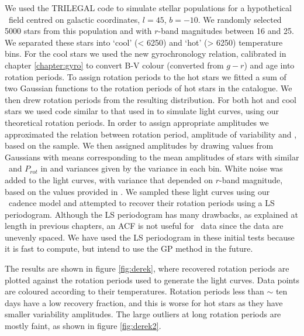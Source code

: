 We used the TRILEGAL \citep{Girardi2012} code to simulate stellar populations
for a hypothetical \LSST\ field centred on galactic coordinates, $l = 45$, $b
= -10$.
We randomly selected 5000 stars from this population and with $r$-band
magnitudes between 16 and 25.
We separated these stars into `cool' (< 6250) and `hot' (> 6250) temperature
bins.
For the cool stars we used the new gyrochronology relation, calibrated in
chapter \ref{chapter:gyro} to convert B-V colour (converted from $g-r$) and
age into rotation periods.
To assign rotation periods to the hot stars we fitted a sum of two Gaussian
functions to the rotation periods of hot stars in the \citet{Mcquillan2014}
catalogue.
We then drew rotation periods from the resulting distribution.
For both hot and cool stars we used code similar to that used in
\citet{Aigrain2015} to simulate light curves, using our theoretical rotation
periods.
In order to assign appropriate amplitudes we approximated the relation between
rotation period, amplitude of variability and \teff, based on the
\citet{Mcquillan2014} sample.
We then assigned amplitudes by drawing values from Gaussians with means
corresponding to the mean amplitudes of stars with similar \teff\ and
$P_{rot}$ in \citet{Mcquillan2014} and variances given by the variance in each
bin.
White noise was added to the light curves, with variance that depended on
$r$-band magnitude, based on the values provided in \citet{Jacklin2015}.
We sampled these light curves using our \LSST\ cadence model and attempted to
recover their rotation periods using a LS periodogram.
Although the LS periodogram has many drawbacks, as explained at length in
previous chapters, an ACF is not useful for \LSST\ data since the data are
unevenly spaced.
We have used the LS periodogram in these initial tests because it is fast to
compute, but intend to use the GP method in the future.

The results are shown in figure \ref{fig:derek}, where recovered rotation
periods are plotted against the rotation periods used to generate the light
curves.
Data points are coloured according to their temperatures.
Rotation periods less than $\sim$ ten days have a low recovery fraction, and
this is worse for hot stars as they have smaller variability amplitudes.
The large outliers at long rotation periods are mostly faint, as shown in
figure \ref{fig:derek2}.

